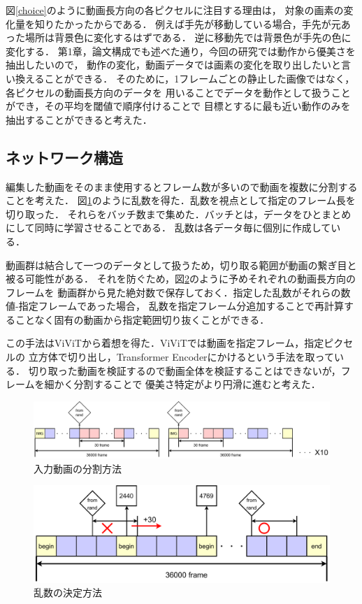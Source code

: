 図\ref{choice}のように動画長方向の各ピクセルに注目する理由は，
対象の画素の変化量を知りたかったからである．
例えば手先が移動している場合，手先が元あった場所は背景色に変化するはずである．
逆に移動先では背景色が手先の色に変化する．
第1章，論文構成でも述べた通り，今回の研究では動作から優美さを抽出したいので，
動作の変化，動画データでは画素の変化を取り出したいと言い換えることができる．
そのために，1フレームごとの静止した画像ではなく，各ピクセルの動画長方向のデータを
用いることでデータを動作として扱うことができ，その平均を閾値で順序付けることで
目標とするに最も近い動作のみを抽出することができると考えた．
\clearpage

\subsection{ネットワーク構造}
編集した動画をそのまま使用するとフレーム数が多いので動画を複数に分割することを考えた．
図\ref{range}のように乱数を得た．乱数を視点として指定のフレーム長を切り取った．
それらをバッチ数まで集めた．バッチとは，データをひとまとめにして同時に学習させることである．
乱数は各データ毎に個別に作成している．

動画群は結合して一つのデータとして扱うため，切り取る範囲が動画の繋ぎ目と被る可能性がある．
それを防ぐため，図\ref{decide_rand}のように予めそれぞれの動画長方向のフレームを
動画群から見た絶対数で保存しておく．指定した乱数がそれらの数値-指定フレームであった場合，
乱数を指定フレーム分追加することで再計算することなく固有の動画から指定範囲切り抜くことができる．

この手法はViViTから着想を得た．ViViTでは動画を指定フレーム，指定ピクセルの
立方体で切り出し，Transformer Encoderにかけるという手法を取っている．
切り取った動画を検証するので動画全体を検証することはできないが，フレームを細かく分割することで
優美さ特定がより円滑に進むと考えた．

\begin{figure}[b]
  \begin{center}
    \includegraphics[width=120mm]{images/chart/range.pdf}
  \end{center}
  \caption{入力動画の分割方法}
  \label{range}
\end{figure}

\begin{figure}[b]
  \begin{center}
    \includegraphics[width=120mm]{images/chart/decide_rand.pdf}
  \end{center}
  \caption{乱数の決定方法}
  \label{decide_rand}
\end{figure}
\clearpage

